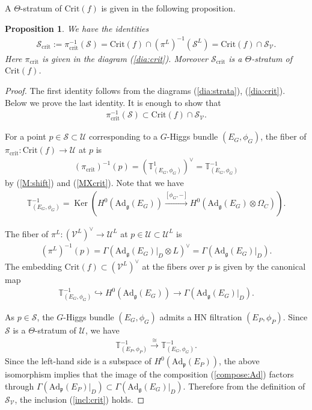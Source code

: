 \documentclass [11pt,oneside,a4paper,mathscr]{amsart}
\newtheorem{prop}[thm]{Proposition}
\theoremstyle{definition}
\newcommand{\sS}{\mathcal{S}}
\newcommand{\U}{\mathcal{U}}
\newcommand{\V}{\mathcal{V}}
\newcommand{\fg}{\mathfrak{g}}
\newcommand{\fp}{\mathfrak{p}}
\newcommand{\Ker}{\operatorname{Ker}}
\newcommand{\Ad}{\mathrm{Ad}}
\begin{document}
A $\Theta$-stratum of $\mathrm{Crit}(f)$ is given in the following proposition. 
\begin{prop}\label{lem:theta:crit2}
We have the identities 
\begin{align*}%
    \sS_{\mathrm{crit}}:=\pi_{\mathrm{crit}}^{-1}(\sS)=
    \mathrm{Crit}(f)\cap (\pi^L)^{-1}(\sS^L)=\mathrm{Crit}(f) \cap \sS_{\V}. 
\end{align*}
Here $\pi_{\mathrm{crit}}$ is given in the diagram (\ref{dia:crit}). 
Moreover $\sS_{\mathrm{crit}}$ is a 
$\Theta$-stratum of $\mathrm{Crit}(f)$. 
\end{prop}
\begin{proof}
The first identity follows from the diagrams (\ref{dia:strata}), (\ref{dia:crit}). 
Below we prove the last identity. It is enough to show that 
\begin{align}\label{incl:crit}
\pi_{\mathrm{crit}}^{-1}(\sS) \subset \mathrm{Crit}(f) \cap \sS_{\V}. 
\end{align}

    For a point $p \in \sS \subset \U$ corresponding 
    to a $G$-Higgs bundle $(E_G, \phi_G)$, the fiber of 
    $\pi_{\mathrm{crit}} \colon \mathrm{Crit}(f) \to \U$ at $p$ is 
    \begin{align*}
(\pi_{\mathrm{crit}})^{-1}(p)=(\mathbb{T}_{(E_G, \phi_G)}^1)^{\vee}=\mathbb{T}_{(E_G, \phi_G)}^{-1}
    \end{align*}
    by (\ref{M:shift}) and (\ref{MXcrit}). 
Note that we have 
\begin{align*}
    \mathbb{T}_{(E_G, \phi_G)}^{-1}=\Ker(H^0(\Ad_{\fg}(E_G)) \stackrel{[\phi_G, -]}{\to}
    H^0(\Ad_{\fg}(E_G)\otimes \Omega_C)).
\end{align*}

The fiber of $\pi^L \colon (\V^L)^{\vee} \to \U^L$ 
at $p \in \U \subset \U^L$ is 
\begin{align*}
(\pi^L)^{-1}(p)=\Gamma(\Ad_{\fg}(E_G)|_{D}\otimes L)^{\vee}=
\Gamma(\Ad_{\fg}(E_G)|_{D}).
\end{align*}
   The embedding $\mathrm{Crit}(f) \subset (\V^L)^{\vee}$ 
   at the fibers over $p$ is given by 
   the canonical map 
   \begin{align}\label{compose:Ad}
       \mathbb{T}_{(E_G, \phi_G)}^{-1} \hookrightarrow H^0(\Ad_{\fg}(E_G))
       \to \Gamma(\Ad_{\fg}(E_G)|_{D}).
   \end{align}
   
   As $p\in \sS$, the $G$-Higgs bundle $(E_G, \phi_G)$ admits a 
   HN filtration $(E_P, \phi_P)$. 
   Since $\mathcal{S}$ is a $\Theta$-stratum of $\mathcal{U}$, 
   we have 
   \begin{align*}
         \mathbb{T}_{(E_P, \phi_P)}^{-1} \stackrel{\cong}{\to} 
         \mathbb{T}_{(E_G, \phi_G)}^{-1}.
   \end{align*}
   Since the left-hand side is a subspace of $H^0(\Ad_{\fp}(E_P))$, 
   the above isomorphism implies that the image of the composition (\ref{compose:Ad})
   factors through $\Gamma(\Ad_{\fp}(E_P)|_{D})\subset \Gamma(\Ad_{\fg}(E_G)|_{D})$.
   Therefore from the definition of $\mathcal{S}_{\mathcal{V}}$, the inclusion (\ref{incl:crit}) holds.  
   \end{proof}
\end{document}

